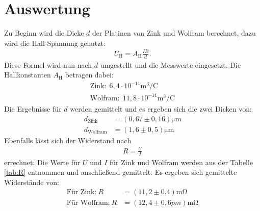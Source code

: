 \section{Auswertung}
\label{sec:Auswertung}
Zu Beginn wird die Dicke $d$ der Platinen von Zink und Wolfram
berechnet, dazu wird die Hall-Spannung genutzt:
\begin{align}
U_\mathrm{H}=A_\mathrm{H}\frac{IB}{d}.
\end{align}
Diese Formel wird nun nach $d$ umgestellt und die Messwerte eingesetzt.
Die Hallkonstanten $A_\mathrm{H}$ betragen dabei:
\begin{align*}
  \text{Zink:}\ \ 6,4\cdot10^{-11}\si{\meter\tothe{3}\per\coulomb}\\
  \text{Wolfram:}\ \ 11,8\cdot10^{-11}\si{\meter\tothe{3}\per\coulomb}
  \end{align*}
Die Ergebnisse für $d$ werden gemittelt und es ergeben sich die zwei Dicken von:
\begin{align*}
d_\mathrm{Zink}&=(0,67\pm0,16)\si{\micro\meter}\\
d_\mathrm{Wolfram}&=(1,6\pm0,5)\si{\micro\meter}
\end{align*}
Ebenfalls lässt sich
der Widerstand nach
\begin{align}
  R=\frac{U}{I}
\end{align}
errechnet:
Die Werte für $U$ und $I$ für Zink und Wolfram werden aus der Tabelle \ref{tab:R} entnommen und anschließend gemittelt.
Es ergeben sich gemittelte Widerstände von:
\begin{align*}
\text{Für Zink:} \ R&=(11,2\pm0.4)\si{\milli\ohm}\\
\text{Für Wolfram:} \ R&=(12,4\pm0,6pm)\si{\milli\ohm}
\end{align*}
